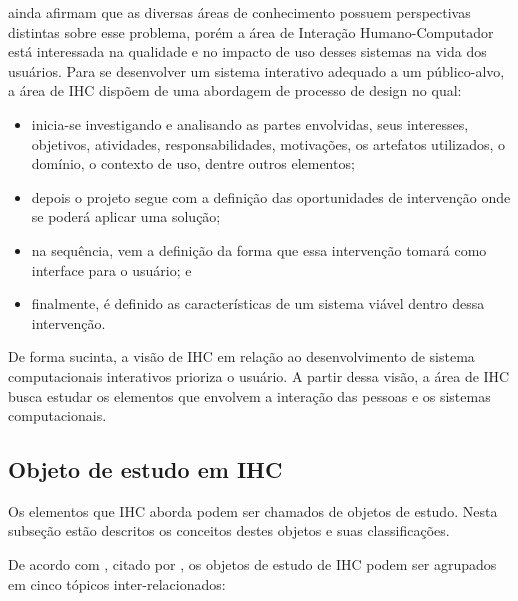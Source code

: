  ainda afirmam que as diversas áreas de conhecimento possuem perspectivas distintas sobre esse problema, porém a área de Interação Humano-Computador está interessada na qualidade e no impacto de uso desses sistemas na vida dos usuários. Para se desenvolver um sistema interativo adequado a um público-alvo, a área de IHC dispõem de uma abordagem de processo de design no qual:

\begin{itemize}
    \item inicia-se investigando e analisando as partes envolvidas, seus interesses, objetivos, atividades, responsabilidades, motivações, os artefatos utilizados, o domínio, o contexto de uso, dentre outros elementos;
    \item depois o projeto segue com a definição das oportunidades de intervenção onde se poderá aplicar uma solução;
    \item na sequência, vem a definição da forma que essa intervenção tomará como interface para o usuário; e
    \item finalmente, é definido as características de um sistema viável dentro dessa intervenção.
\end{itemize}    %

De forma sucinta, a visão de IHC em relação ao desenvolvimento de sistema computacionais interativos prioriza o usuário. A partir dessa visão, a área de IHC busca estudar os elementos que envolvem a interação das pessoas e os sistemas computacionais.

\subsection{Objeto de estudo em IHC}
\label{sub:obj}
Os elementos que IHC aborda podem ser chamados de objetos de estudo. Nesta subseção estão descritos os conceitos destes objetos e suas classificações. 

De acordo com , citado por , os objetos de estudo de IHC podem ser agrupados em cinco tópicos inter-relacionados: %

